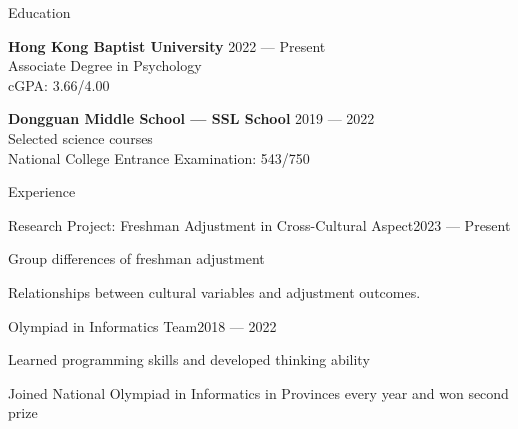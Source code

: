 \documentclass[
	11pt, %
]{resume} %
\begin{document}
\begin{rSection}{Education}

    \textbf{Hong Kong Baptist University} \hfill 2022 --- Present \\
    Associate Degree in Psychology \\
    cGPA: 3.66/4.00

    \textbf{Dongguan Middle School --- SSL School} \hfill 2019 --- 2022 \\
    Selected science courses \\
    National College Entrance Examination: 543/750

\end{rSection}


\begin{rSection}{Experience}

    \begin{rSubsection}{Research Project: Freshman Adjustment in Cross-Cultural Aspect}{2023 --- Present}{}{}
        \item Group differences of freshman adjustment
        \item Relationships between cultural variables and adjustment outcomes.
    \end{rSubsection}



    \begin{rSubsection}{Olympiad in Informatics Team}{2018 --- 2022}{}{}
        \item Learned programming skills and developed thinking ability
        \item Joined National Olympiad in Informatics in Provinces every year and won second prize
    \end{rSubsection}

\end{rSection}
\end{document}
